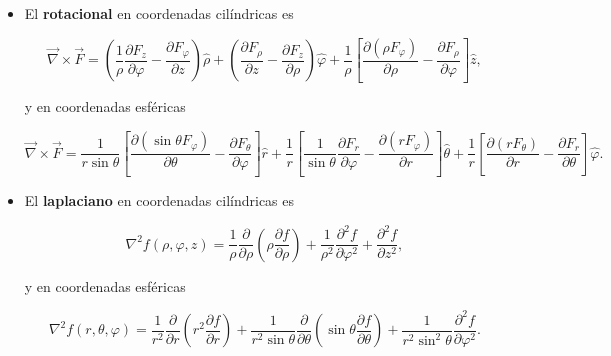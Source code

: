 \begin{itemize}
\item[iii)] El \textbf{rotacional} en coordenadas cilíndricas es
\begin{shaded}
\begin{equation}
\vec{\nabla} \times \vec{F} = \left( \frac{1}{\rho} \frac{\partial F_z}{\partial \varphi} - \frac{\partial F_{\varphi}}{\partial z}\right) \hat{\rho} + \left( \frac{\partial F_{\rho}}{\partial z} - \frac{\partial F_z}{\partial \rho}\right) \hat{\varphi} + \frac{1}{\rho} \left[ \frac{\partial (\rho F_{\varphi})}{\partial \rho} - \frac{\partial F_{\rho}}{\partial \varphi} \right] \hat{z},
\end{equation}
\end{shaded}
y en coordenadas esféricas
\begin{shaded}
\begin{equation}
\vec{\nabla} \times \vec{F} = \frac{1}{r \sin \theta} \left[ \frac{\partial (\sin\theta F_{\varphi})}{\partial \theta} - \frac{\partial F_{\theta}}{\partial \varphi} \right]\hat{r} + \frac{1}{r} \left[ \frac{1}{\sin \theta} \frac{\partial F_r}{\partial \varphi} - \frac{\partial (r F_{\varphi})}{\partial r} \right] \hat{\theta} 
     + \frac{1}{r} \left[ \frac{\partial (rF_{\theta})}{\partial r} - \frac{\partial F_r}{\partial \theta} \right] \hat{\varphi}.
\end{equation}
\end{shaded}

\item[iv)] El \textbf{laplaciano} en coordenadas cilíndricas es
\begin{shaded}
\begin{equation}
\nabla^2 f(\rho, \varphi,z) = \frac{1}{\rho} \frac{\partial}{\partial \rho} \left(\rho \frac{\partial f}{\partial \rho} \right) + \frac{1}{\rho^2} \frac{\partial^2 f}{\partial \varphi^2}  + \frac{\partial^2 f}{\partial z^2},
\end{equation}
\end{shaded}
y en coordenadas esféricas
\begin{shaded}
\begin{equation}
\nabla^2 f(r,\theta,\varphi) = \frac{1}{r^2} \frac{\partial}{\partial r} \left( r^2 \frac{\partial f}{\partial r} \right) + \frac{1}{r^2 \sin\theta} \frac{\partial}{\partial \theta} \left( \sin \theta \frac{\partial f}{\partial \theta}\right) + \frac{1}{r^2 \sin^2\theta} \frac{\partial^2 f}{\partial \varphi^2}.
\end{equation}
\end{shaded}
\end{itemize}




